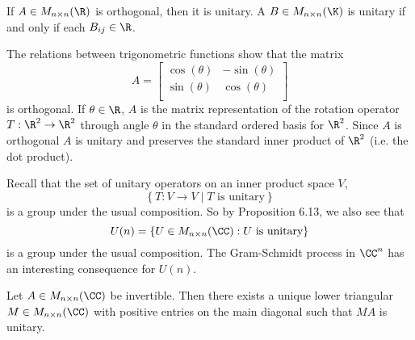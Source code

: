 \documentclass[linearalgebra]{subfiles}
\begin{document}
    \begin{remark}
        If $A\in M_{n\times n}(\R)$ is orthogonal, then it is unitary. A $B\in M_{n\times n}(\K)$ is unitary if and only if each $B_{ij}\in\R$.
    \end{remark}

    \begin{example}
        The relations between trigonometric functions show that the matrix
        \begin{equation*}
            A =
            \begin{bmatrix}
                \cos(\theta) & -\sin(\theta) \\
                \sin(\theta) & \cos(\theta) \\
            \end{bmatrix}
        \end{equation*}
        is orthogonal. If $\theta\in\R$, $A$ is the matrix representation of the rotation operator $T:\R^2\to\R^2$ through angle $\theta$ in the standard ordered basis for $\R^2$. Since $A$ is orthogonal $A$ is unitary and preserves the standard inner product of $\R^2$ (i.e. the dot product).
    \end{example}

    \begin{remark}
        Recall that the set of unitary operators on an inner product space $V$,
        \begin{equation*}
            \left\lbrace T:V\to V\mid T\text{ is unitary} \right\rbrace 
        \end{equation*}
        is a group under the usual composition. So by Proposition 6.13, we also see that
        \begin{equation*}
            U(n) = \left\lbrace U\in M_{n\times n}(\CC): U\text{ is unitary} \right\rbrace 
        \end{equation*}
        is a group under the usual composition. The Gram-Schmidt process in $\CC^n$ has an interesting consequence for $U(n)$.
    \end{remark}

    \clearpage
    \begin{prop}{}
        Let $A\in M_{n\times n}(\CC)$ be invertible. Then there exists a unique lower triangular $M\in M_{n\times n}(\CC)$ with positive entries on the main diagonal such that $MA$ is unitary.
    \end{prop}
\end{document}

